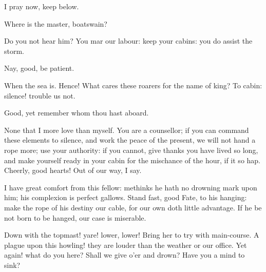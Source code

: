 \begin{prose_speech}[Boatswain] I pray now, keep below.\end{prose_speech}

\begin{prose_speech}[Antonio] Where is the master, boatswain?\end{prose_speech}

\begin{prose_speech}[Boatswain] Do you not hear him? You mar our labour: keep your cabins: you do assist the storm.
\end{prose_speech}

\begin{prose_speech}[Gonzalo] Nay, good, be patient.\end{prose_speech}

\begin{prose_speech}[Boatswain] When the sea is. Hence! What cares these roarers for the name of king? To cabin: silence! trouble us not.\end{prose_speech}

\begin{prose_speech}[Gonzalo] Good, yet remember whom thou hast aboard.\end{prose_speech}

\begin{prose_speech}[Boatswain] None that I more love than myself. You are a counsellor; if you can command these elements to silence, and work the peace of the present, we will not hand a rope more; use your authority: if you cannot, give thanks you have lived so long, and make yourself ready in your cabin for the mischance of the hour, if it so hap. Cheerly, good hearts! Out of our way, I say.
\end{prose_speech}


\begin{prose_speech}[Gonzalo] I have great comfort from this fellow: methinks he hath no drowning mark upon him; his complexion is perfect gallows. Stand fast, good Fate, to his hanging: make the rope of his destiny our cable, for our own doth little advantage. If he be not born to be hanged, our case is miserable.
\end{prose_speech}




\begin{prose_speech}[Boatswain] Down with the topmast! yare! lower, lower! Bring her to try with main-course.
A plague upon this howling! they are louder than the weather or our office.
Yet again! what do you here? Shall we give o'er and drown? Have you a mind to sink?
\end{prose_speech}

